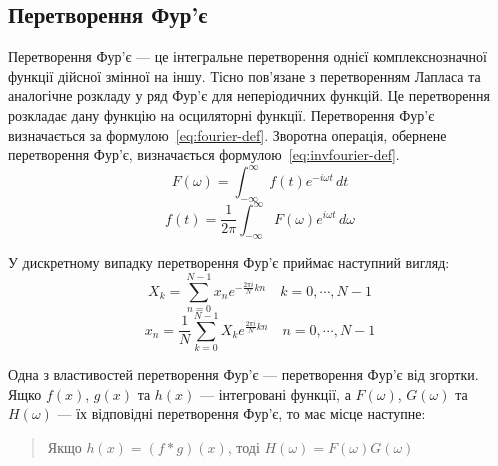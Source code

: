 \documentclass{diploma}
\begin{document}
    \subsection{Перетворення Фур’є}
      Перетворення Фур’є --- це інтегральне перетворення однієї комплекснозначної
      функції дійсної змінної на іншу.
      Тісно пов’язане з перетворенням Лапласа та аналогічне розкладу у ряд
      Фур’є для неперіодичних функцій.
      Це перетворення розкладає дану функцію на осциляторні функції.
      Перетворення Фур’є визначається за формулою~\eqref{eq:fourier-def}.
      Зворотна операція, обернене перетворення Фур’є, визначається
      формулою~\eqref{eq:invfourier-def}.
      \begin{equation}
        F\left( \omega \right) = \int_{-\infty}^\infty f\left( t \right) e^{-i
        \omega t }\,dt
        \label{eq:fourier-def}
      \end{equation}
      \begin{equation}
        f\left( t \right) = \frac{1}{2 \pi} \int_{-\infty}^\infty F\left(
        \omega \right) e^{i \omega t}\, d\omega
        \label{eq:invfourier-def}
      \end{equation}

      У дискретному випадку перетворення Фур’є приймає наступний вигляд:
      \begin{equation}
        X_k = \sum_{n = 0}^{N - 1} x_n e^{-\frac{2 \pi i}{N} k n} \quad k =
        0,\cdots, N - 1
        \label{eq:fourier-def-discrete}
      \end{equation}
      \begin{equation}
        x_n = \frac{1}{N} \sum_{k = 0}^{N - 1} X_k e^{\frac{2 \pi i}{N} k n}
        \quad n = 0,\cdots, N - 1
        \label{eq:invfourier-def-discrete}
      \end{equation}

      Одна з властивостей перетворення Фур’є --- перетворення Фур’є від
      згортки.
      Ящко $f\left( x \right)$, $g\left( x \right)$ та $h\left( x \right)$ ---
      інтегровані функції, а $F\left( \omega \right)$, $G\left( \omega
      \right)$
      та $H\left( \omega \right)$ --- їх відповідні перетворення Фур’є, то має
      місце наступне:
      \begin{quote}
        Якщо $h\left( x \right) = \left( f \ast g \right)\left( x \right)$,
        тоді $H\left( \omega \right) = F\left( \omega \right) G\left( \omega
        \right)$
      \end{quote}
\end{document}
